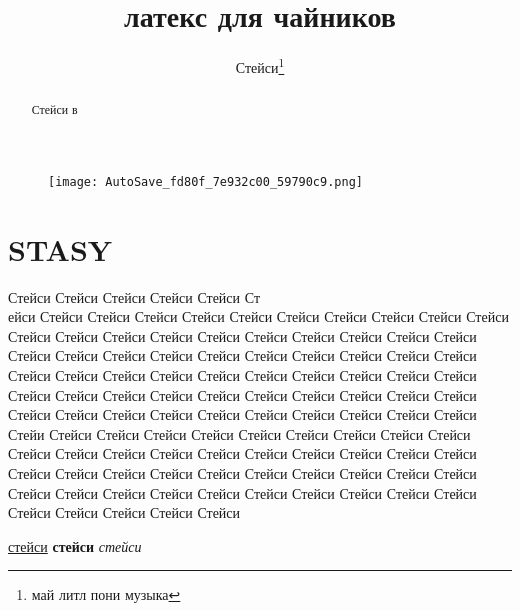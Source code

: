 \documentclass{article}
\title{латекс для чайников}
\author{Стейси\thanks{май литл пони музыка}}
\begin{document}
\begin{figure}
    \centering
    \texttt{[image: AutoSave\_fd80f\_7e932c00\_59790c9.png]}
\end{figure}
\maketitle
 \section{STASY}
Стейси Стейси Стейси Стейси Стейси Ст\\ейси Стейси Стейси Стейси Стейси Стейси Стейси Стейси Стейси Стейси Стейси Стейси Стейси Стейси Стейси Стейси Стейси Стейси Стейси Стейси Стейси Стейси Стейси Стейси Стейси Стейси Стейси Стейси Стейси Стейси Стейси Стейси Стейси Стейси Стейси Стейси Стейси Стейси Стейси Стейси Стейси Стейси Стейси Стейси Стейси Стейси Стейси Стейси Стейси Стейси Стейси Стейси Стейси Стейси Стейси Стейси Стейси Стейси Стейси Стейси Стейси Стейи Стейси Стейси Стейси Стейси Стейси Стейси Стейси Стейси Стейси Стейси Стейси Стейси Стейси Стейси Стейси Стейси Стейси Стейси Стейси Стейси Стейси Стейси Стейси Стейси Стейси Стейси Стейси Стейси Стейси Стейси Стейси Стейси Стейси Стейси Стейси Стейси Стейси Стейси Стейси Стейси Стейси Стейси Стейси Стейси 
\begin{abstract}
    Стейси в 
\end{abstract}


\underline{стейси}
\textbf{стейси}
\textit{стейси}
\maketitle

\end{document}
